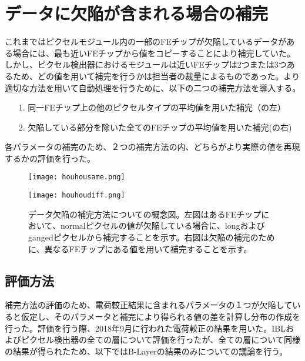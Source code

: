 \section{データに欠陥が含まれる場合の補完}
\label{sec:kessonhosei}
これまではピクセルモジュール内の一部のFEチップが欠陥しているデータがある場合には、最も近いFEチップから値をコピーすることにより補完していた。しかし、ピクセル検出器におけるモジュールは近いFEチップは2つまたは3つあるため、どの値を用いて補完を行うかは担当者の裁量によるものであった。より適切な方法を用いて自動処理を行うために、以下の二つの補完方法を導入する。
\begin{itemize}
  \item[1. ] 同一FEチップ上の他のピクセルタイプの平均値を用いた補完（の左）
  \item[2. ] 欠陥している部分を除いた全てのFEチップの平均値を用いた補完(の右)
\end{itemize}
各パラメータの補完のため、２つの補完方法の内、どちらがより実際の値を再現するかの評価を行った。

\begin{figure}[tbp]
  \begin{minipage}[b]{0.45\linewidth}
    \centering
    \texttt{[image: houhousame.png]}
  \end{minipage}
  \begin{minipage}[b]{0.55\linewidth}
    \centering
    \texttt{[image: houhoudiff.png]}
  \end{minipage}
  \caption[データ欠陥の補完方法]{データ欠陥の補完方法についての概念図。左図はあるFEチップにおいて、normalピクセルの値が欠陥している場合に、longおよびgangedピクセルから補完することを示す。右図は欠陥の補完のために、異なるFEチップにある値を用いて補完することを示す。}
  \label{fig:houhouhou}
\end{figure}


\subsection{評価方法}
補完方法の評価のため、電荷較正結果に含まれるパラメータの１つが欠陥していると仮定し、そのパラメータと補完により得られる値の差を計算し分布の作成を行った。評価を行う際、2018年9月に行われた電荷較正の結果を用いた。IBLおよびピクセル検出器の全ての層について評価を行ったが、全ての層について同様の結果が得られたため、以下ではB-Layerの結果のみについての議論を行う。

